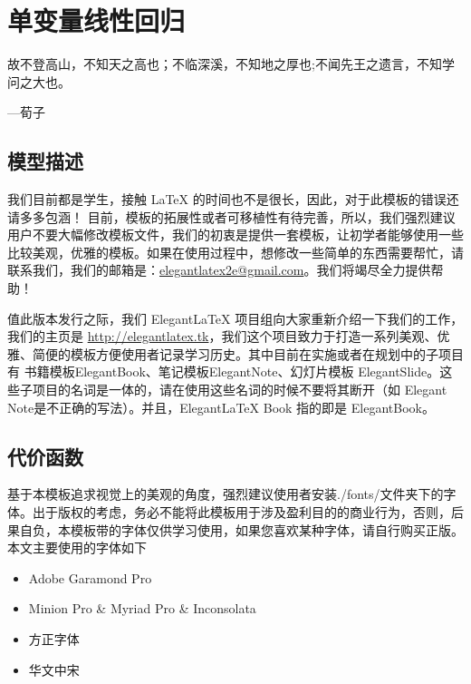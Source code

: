 \chapter{单变量线性回归}

\begin{flushleft}
故不登高山，不知天之高也；不临深溪，不知地之厚也;不闻先王之遗言，不知学问之大也。
\end{flushleft}

\begin{flushright}
---荀子   
\end{flushright}

\section{模型描述}
 我们目前都是学生，接触 \LaTeX{} 的时间也不是很长，因此，对于此模板的错误还请多多包涵！ 目前，模板的拓展性或者可移植性有待完善，所以，我们强烈建议用户不要大幅修改模板文件，我们的初衷是提供一套模板，让初学者能够使用一些比较美观，优雅的模板。如果在使用过程中，想修改一些简单的东西需要帮忙，请联系我们，我们的邮箱是：\href{elegantlatex2e@gmail.com}{elegantlatex2e@gmail.com}。我们将竭尽全力提供帮助！

值此版本发行之际，我们 Elegant\LaTeX{} 项目组向大家重新介绍一下我们的工作，我们的主页是 \href{http://elegantlatex.tk}{http://elegantlatex.tk}，我们这个项目致力于打造一系列美观、优雅、简便的模板方便使用者记录学习历史。其中目前在实施或者在规划中的子项目有 书籍模板ElegantBook、笔记模板ElegantNote、幻灯片模板 ElegantSlide。这些子项目的名词是一体的，请在使用这些名词的时候不要将其断开（如 Elegant Note是不正确的写法）。并且，Elegant\LaTeX{}  Book 指的即是 ElegantBook。

\section{代价函数}

基于本模板追求视觉上的美观的角度，强烈建议使用者安装./fonts/文件夹下的字体。出于版权的考虑，务必不能将此模板用于涉及盈利目的的商业行为，否则，后果自负，本模板带的字体仅供学习使用，如果您喜欢某种字体，请自行购买正版。本文主要使用的字体如下
\begin{itemize}
\itemsep=3pt
\parskip=0pt
\item Adobe Garamond Pro
\item Minion Pro \& Myriad Pro  \& Inconsolata
\item 方正字体
\item 华文中宋
\end{itemize}

